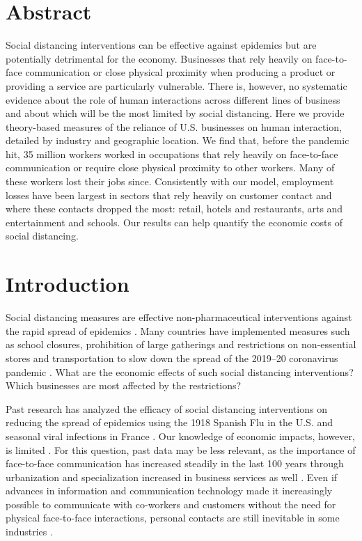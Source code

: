 \documentclass[10pt,letterpaper]{article}
\begin{document}
\section*{Abstract}
Social distancing interventions can be effective against epidemics but are potentially detrimental for the economy.
Businesses that rely heavily on face-to-face communication or close physical proximity when producing a product or providing a service are particularly vulnerable. 
There is, however, no systematic evidence about the role of human interactions across different lines of business and about which will be the most limited by social distancing.
Here we provide theory-based measures of the reliance of U.S. businesses on human interaction, detailed by industry and geographic location.
We find that, before the pandemic hit, 35 million workers worked in occupations that rely heavily on face-to-face communication or require close physical proximity to other workers. Many of these workers lost their jobs since. Consistently with our model, employment losses have been largest in sectors that rely heavily on customer contact and where these contacts dropped the most: retail, hotels and restaurants, arts and entertainment and schools. Our results can help quantify the economic costs of social distancing.

\linenumbers


\section*{Introduction}

Social distancing measures are effective non-pharmaceutical interventions against the rapid spread of epidemics \cite{Bootsma2007-ww,Markel2007-ad,Hatchett2007-gc,Wilder-Smith2020-jj}. Many countries have implemented measures such as school closures, prohibition of large gatherings and restrictions on non-essential stores and transportation to slow down the spread of the 2019--20 coronavirus pandemic \cite{Anderson2020-qk,Cohen2020-jw,Thompson2020-lc,noauthor_2020-xi}. What are the economic effects of such social distancing interventions? Which businesses are most affected by the restrictions?

Past research has analyzed the efficacy of social distancing interventions on reducing the spread of epidemics using the 1918 Spanish Flu in the U.S. \cite{Hatchett2007-gc,Markel2007-ad,Bootsma2007-ww} and seasonal viral infections in France \cite{Adda2016-mn}. Our knowledge of economic impacts, however, is limited \cite{Wren-Lewis2020-vc}. For this question, past data may be less relevant, as the importance of face-to-face communication has increased steadily in the last 100 years through urbanization \cite{Henderson2010-mv,Henderson2002-ji} and specialization increased in business services as well \cite{Herrendorf2014-jx,Duarte2019-kc}. 
Even if advances in information and communication technology made it increasingly possible to communicate with co-workers and customers without the need for physical face-to-face interactions, personal contacts are still inevitable in some industries \cite{Dingel2020-lh,von2020labour}.
\end{document}
